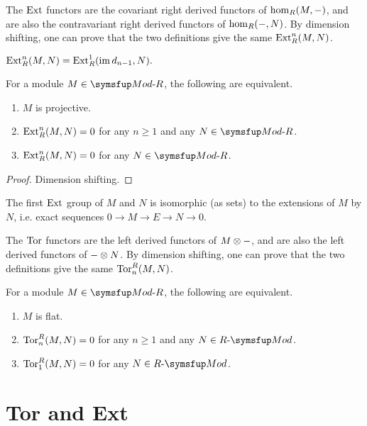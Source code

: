 The $\operatorname{Ext}$ functors are the covariant right derived functors of $\operatorname{hom}_R(M,
{-})$, and are also the contravariant right derived functors of $\operatorname{hom}_R({-}, N)$. By dimension shifting, one can prove that the two definitions give the same $\operatorname{Ext}_R^n(M, N)$.

\begin{remark}
  $\operatorname{Ext}^n_R(M, N)=\operatorname{Ext}_R^1(\operatorname{im} d_{n-1}, N).$
\end{remark}

\begin{proposition}
  For a module $M\in \MODR$, the following are equivalent.
  \begin{enumerate}
    \item $M$ is projective.
    \item $\operatorname{Ext}_R^n(M, N)=0$ for any $n\geq 1$ and any $N\in\MODR$.
    \item $\operatorname{Ext}_R^n(M, N)=0$ for any $N\in\MODR$.
  \end{enumerate}
\end{proposition}

\begin{proof}
  Dimension shifting.
\end{proof}

\begin{remark}
  The first $\operatorname{Ext}$ group of $M$ and $N$ is isomorphic (as sets) to the extensions of $M$ by $N$, i.e. exact sequences $0\to M\to E\to N\to 0$.
\end{remark}

The $\operatorname{Tor}$ functors are the left derived functors of $M\otimes {-}$, and are also the left derived functors of ${-}\otimes N$. By dimension shifting, one can prove that the two definitions give the same $\operatorname{Tor}_n^R(M, N)$.

\begin{proposition}
  For a module $M\in\MODR$, the following are equivalent.
  \begin{enumerate}
    \item $M$ is flat.
    \item $\operatorname{Tor}_n^R(M, N)=0$ for any $n\geq 1$ and any $N\in\RMOD$.
    \item $\operatorname{Tor}_1^R(M, N)=0$ for any $N\in\RMOD$.
  \end{enumerate}
\end{proposition}

\section{Tor and Ext}

